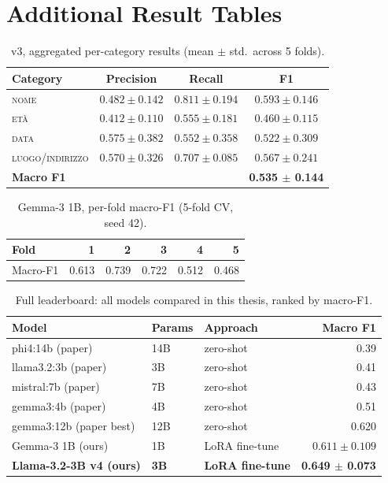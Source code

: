 \documentclass[12pt,a4paper]{report}
\newcommand{\NOME}{\textsc{nome}}
\newcommand{\ETA}{\textsc{et\`a}}
\newcommand{\DATA}{\textsc{data}}
\newcommand{\LUOGO}{\textsc{luogo\slash indirizzo}}
\begin{document}
\chapter{Additional Result Tables}
\label{app:additional}

\begin{table}[htbp]
\centering
\caption{v3, aggregated per-category results (mean $\pm$ std.\ across 5 folds).}
\label{tab:v3-aggregate-appendix}
\begin{tabular}{lccc}
\toprule
Category & Precision & Recall & F1 \\
\midrule
\NOME{} & $0.482 \pm 0.142$ & $0.811 \pm 0.194$ & $0.593 \pm 0.146$ \\
\ETA{} & $0.412 \pm 0.110$ & $0.555 \pm 0.181$ & $0.460 \pm 0.115$ \\
\DATA{} & $0.575 \pm 0.382$ & $0.552 \pm 0.358$ & $0.522 \pm 0.309$ \\
\LUOGO{} & $0.570 \pm 0.326$ & $0.707 \pm 0.085$ & $0.567 \pm 0.241$ \\
\midrule
\textbf{Macro F1} & & & \textbf{0.535 $\pm$ 0.144} \\
\bottomrule
\end{tabular}
\end{table}

\begin{table}[htbp]
\centering
\caption{Gemma-3 1B, per-fold macro-F1 (5-fold CV, seed 42).}
\label{tab:gemma1b-folds-appendix}
\begin{tabular}{lrrrrr}
\toprule
Fold & 1 & 2 & 3 & 4 & 5 \\
\midrule
Macro-F1 & 0.613 & 0.739 & 0.722 & 0.512 & 0.468 \\
\bottomrule
\end{tabular}
\end{table}

\begin{table}[htbp]
\centering
\caption{Full leaderboard: all models compared in this thesis, ranked by macro-F1.}
\label{tab:full-leaderboard-appendix}
\begin{tabular}{lllr}
\toprule
Model & Params & Approach & Macro F1 \\
\midrule
phi4:14b (paper) & 14B & zero-shot & 0.39 \\
llama3.2:3b (paper) & 3B & zero-shot & 0.41 \\
mistral:7b (paper) & 7B & zero-shot & 0.43 \\
gemma3:4b (paper) & 4B & zero-shot & 0.51 \\
gemma3:12b (paper best) & 12B & zero-shot & 0.620 \\
Gemma-3 1B (ours) & 1B & LoRA fine-tune & $0.611 \pm 0.109$ \\
\textbf{Llama-3.2-3B v4 (ours)} & \textbf{3B} & \textbf{LoRA fine-tune} & \textbf{0.649 $\pm$ 0.073} \\
\bottomrule
\end{tabular}
\end{table}
\end{document}
